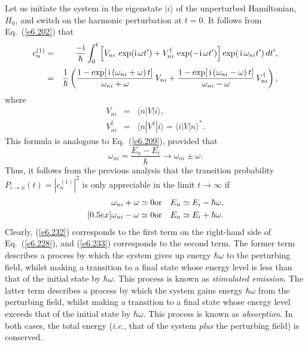Let us initiate the system in the eigenstate $|i\rangle$ of the unperturbed
Hamiltonian, $H_0$, and switch on the harmonic perturbation at $t=0$. 
It follows from Eq.~(\ref{e6.202}) that
\begin{eqnarray}\label{e6.228}
c_n^{(1)} &=& \frac{-{\rm i}}{\hbar} \int_0^t \left[V_{ni} \,\exp({\rm i}\,\omega
t') + V_{ni}^\dagger\, \exp(-{\rm i}\,\omega t')\right]\exp(\,{\rm i}\,
\omega_{ni} t')\, dt',\\[0.5ex]
&=& \frac{1}{\hbar} \left(\frac{1-\exp[\,{\rm i}\,(\omega_{ni} + \omega)\,t]}
{\omega_{ni} + \omega}\, V_{ni}+\frac{1-\exp[\,{\rm i}\,(\omega_{ni}-\omega
)\,t]}
{\omega_{ni} - \omega} \,V_{ni}^\dagger\right),\nonumber
\end{eqnarray}
where
\begin{eqnarray}\label{e6.229}
V_{ni} &=& \langle n|V| i\rangle,\\[0.5ex]
V_{ni}^\dagger &=& \langle n |V^\dagger |i\rangle = \langle i|V|n\rangle^\ast.\label{e6.230}
\end{eqnarray}
This formula is analogous to Eq.~(\ref{e6.209}), provided that
\begin{equation}
\omega_{ni} = \frac{E_n-E_i}{\hbar} \rightarrow \omega_{ni}\pm \omega.
\end{equation}
Thus, it follows from  the previous analysis that
 the transition probability
$P_{i\rightarrow n}(t)=|c_n^{(1)}|^2$ is only appreciable in the limit $t\rightarrow\infty$ if
\begin{eqnarray}\label{e6.232}
\omega_{ni} + \omega \simeq  0 &{\rm or} & E_n \simeq E_i - \hbar \omega,\\
[0.5ex]
\omega_{ni} - \omega \simeq 0 &{\rm or} & E_n \simeq E_i + \hbar \omega.\label{e6.233}
\end{eqnarray}
Clearly, (\ref{e6.232}) corresponds to the first term on the right-hand side
of Eq.~(\ref{e6.228}), and (\ref{e6.233}) corresponds to the second term. The former
term describes a process by which the system gives up energy $\hbar\omega$
to the perturbing field, whilst making a transition 
to a final state whose energy level is less than that of the initial
state by $\hbar\omega$. This process is known as {\em stimulated emission}.
The latter term describes a process by which the system gains 
energy $\hbar\omega$ from the perturbing field, whilst making a transition
to a final state whose energy level exceeds that of the initial
state by $\hbar\omega$. This process is known as {\em absorption}. In
both cases, the total energy ({\em i.e.}, that of the system {\em plus}
the perturbing field) is conserved.

